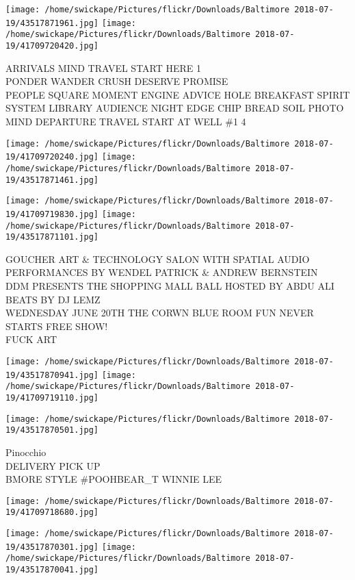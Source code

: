 \documentclass[10pt,letterpaper]{article}
\begin{document}
\texttt{[image: /home/swickape/Pictures/flickr/Downloads/Baltimore 2018-07-19/43517871961.jpg]}
\texttt{[image: /home/swickape/Pictures/flickr/Downloads/Baltimore 2018-07-19/41709720420.jpg]}

ARRIVALS MIND TRAVEL START HERE 1\\
PONDER WANDER CRUSH DESERVE PROMISE\\
PEOPLE SQUARE MOMENT ENGINE ADVICE HOLE BREAKFAST SPIRIT SYSTEM LIBRARY AUDIENCE NIGHT EDGE CHIP BREAD SOIL PHOTO\\
MIND DEPARTURE TRAVEL START AT WELL \#1 4
\pagebreak

\texttt{[image: /home/swickape/Pictures/flickr/Downloads/Baltimore 2018-07-19/41709720240.jpg]}
\texttt{[image: /home/swickape/Pictures/flickr/Downloads/Baltimore 2018-07-19/43517871461.jpg]}

\texttt{[image: /home/swickape/Pictures/flickr/Downloads/Baltimore 2018-07-19/41709719830.jpg]}
\texttt{[image: /home/swickape/Pictures/flickr/Downloads/Baltimore 2018-07-19/43517871101.jpg]}

GOUCHER ART \& TECHNOLOGY SALON WITH SPATIAL AUDIO PERFORMANCES BY WENDEL PATRICK \& ANDREW BERNSTEIN\\
DDM PRESENTS THE SHOPPING MALL BALL HOSTED BY ABDU ALI BEATS BY DJ LEMZ\\
WEDNESDAY JUNE 20TH THE CORWN BLUE ROOM FUN NEVER STARTS FREE SHOW!\\
FUCK ART
\pagebreak

\texttt{[image: /home/swickape/Pictures/flickr/Downloads/Baltimore 2018-07-19/43517870941.jpg]}
\texttt{[image: /home/swickape/Pictures/flickr/Downloads/Baltimore 2018-07-19/41709719110.jpg]}

\texttt{[image: /home/swickape/Pictures/flickr/Downloads/Baltimore 2018-07-19/43517870501.jpg]}

Pinocchio\\
DELIVERY PICK UP\\
BMORE STYLE \#POOHBEAR\_T WINNIE LEE
\pagebreak

\texttt{[image: /home/swickape/Pictures/flickr/Downloads/Baltimore 2018-07-19/41709718680.jpg]}

\vspace{0.25in}
\texttt{[image: /home/swickape/Pictures/flickr/Downloads/Baltimore 2018-07-19/43517870301.jpg]}
\texttt{[image: /home/swickape/Pictures/flickr/Downloads/Baltimore 2018-07-19/43517870041.jpg]}
\end{document}
